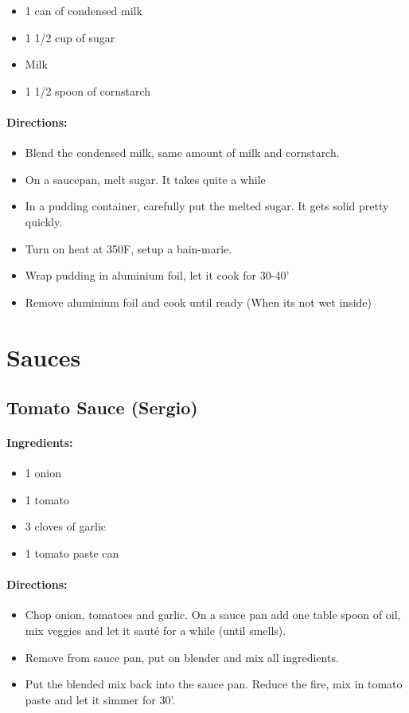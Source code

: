\documentclass{article}
\begin{document}
\begin{itemize}
	\item 1 can of condensed milk
	\item 1 1/2 cup of sugar
	\item Milk
	\item 1 1/2 spoon of cornstarch
\end{itemize}

\paragraph{Directions:}
\begin{itemize}
	\item Blend the condensed milk, same amount of milk and cornstarch.
	\item On a saucepan, melt sugar. It takes quite a while
	\item In a pudding container, carefully put the melted sugar. It gets solid pretty quickly.
	\item Turn on heat at 350F, setup a bain-marie.
	\item Wrap pudding in aluminium foil, let it cook for 30-40'
	\item Remove aluminium foil and cook until ready (When its not wet inside)
\end{itemize}

\section{Sauces}

\subsection{Tomato Sauce (Sergio)}

\paragraph{Ingredients:}

\begin{itemize}
	\item 1 onion 
	\item 1 tomato 
	\item 3 cloves of garlic 
	\item 1 tomato paste can
\end{itemize}

\paragraph{Directions:}
\begin{itemize}
	\item Chop onion, tomatoes and garlic. On a sauce pan add one table spoon of oil, mix veggies and let it sauté for a while (until smells). 
	\item Remove from sauce pan, put on blender and mix all ingredients. 
	\item Put the blended mix back into the sauce pan. Reduce the fire, mix in tomato paste and let it simmer for 30'.
\end{itemize}
\end{document}
